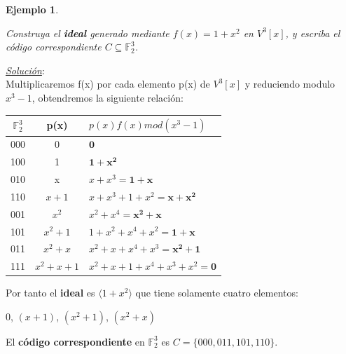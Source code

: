 \documentclass{beamer}
\theoremstyle{plain}
\theoremstyle{example}
\newtheorem{ejercicio} [Ejercicio]{Ejercicio}
\theoremstyle{example}
\newtheorem{ejemplo} [Ejemplo] {Ejemplo}
\begin{document}
\begin{frame}  \footnotesize  

\begin{ejemplo}\label{ej:Ideal}

Construya el \textbf{ideal} generado mediante $f(x) = 1 + x^2$ en $V^3[x]$, y escriba el código correspondiente $C \subseteq \mathbb{F}_2^3$.

\end{ejemplo}

\textit{\underline{Solución}}:\\
Multiplicaremos f(x) por cada elemento p(x) de $V^3[x]$ y reduciendo modulo $x^3 - 1$, obtendremos la siguiente relación:
\begin{center}
 \begin{tabular}{ccl}
	    $\mathbb{F}_2^3$ & p(x) &  $p(x)f(x) mod (x^3-1)$  \\\hline
					 000 &  0 &     $\mathbf{0}$\\ 
					 100 &  1 &     $\mathbf{1+x^2}$\\ 
					 010 &  x &     $x+x^3=\mathbf{1+x}$\\ 
					 110 &  $x+1$ &   $x+x^3+1+x^2=\mathbf {x+x^2} $ \\ 
					 001 &  $x^2$ &    $x^2 + x^4 = \mathbf {x^2 +x} $\\ 
					 101 &  $x^2+1$ &  $1+x^2+x^4+x^2 =\mathbf {1+x} $  \\ 
					 011 &  $x^2+x$ &   $ x^2+x+x^4+x^3=\mathbf {x^2+1} $\\ 
					 111 &  $x^2+x+1$ &   $x^2+x+1+x^4+x^3+x^2=\mathbf {0}$  \\ 

     \end{tabular}	    		
\end{center}

Por tanto el \textbf{ideal} es $\langle 1 + x^2 \rangle$ que tiene solamente cuatro elementos:

\begin{center}
$0$, $(x+1)$, $(x^2+1)$, $(x^2+x)$
\end{center}

El \textbf{código correspondiente} en $\mathbb{F}_2^3$ es $C = \{000, 011, 101, 110\}.$

\end{frame} 

\end{document}
